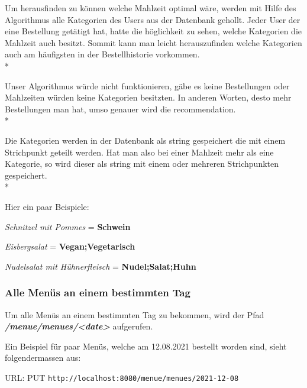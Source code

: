 \pagebreak

Um herausfinden zu können welche Mahlzeit optimal wäre, werden mit Hilfe des Algorithmus alle Kategorien des Users aus der Datenbank gehollt. 
Jeder User der eine Bestellung getätigt hat, hatte die höglichkeit zu sehen, welche Kategorien die Mahlzeit auch besitzt. Sommit kann man leicht herauszufinden
welche Kategorien auch am häufigsten in der Bestellhistorie vorkommen. \\*

Unser Algorithmus würde nicht funktionieren, gäbe es keine Bestellungen oder Mahlzeiten würden keine Kategorien besitzten. 
In anderen Worten, desto mehr Bestellungen man hat, umso genauer wird die recommendation. \\*

Die Kategorien werden in der Datenbank als string gespeichert die mit einem Strichpunkt geteilt werden. Hat man also bei einer Mahlzeit mehr als eine Kategorie,
so wird dieser als string mit einem oder mehreren Strichpunkten gespeichert. \\*


Hier ein paar Beispiele:

\textit{Schnitzel mit Pommes} = \textbf{Schwein}

\textit{Eisbergsalat} = \textbf{Vegan;Vegetarisch}

\textit{Nudelsalat mit Hühnerfleisch} = \textbf{Nudel;Salat;Huhn}

\subsubsection{Alle Menüs an einem bestimmten Tag}

Um alle Menüs an einem bestimmten Tag zu bekommen, wird der Pfad \textbf{\textit{/menue/menues/<date>}} aufgerufen.

Ein Beispiel für paar Menüs, welche am 12.08.2021 bestellt worden sind, sieht folgendermassen aus:

URL: PUT \colorbox{white}{\lstinline[basicstyle=\ttfamily\color{black},language=html]|http://localhost:8080/menue/menues/2021-12-08|}

\pagebreak

